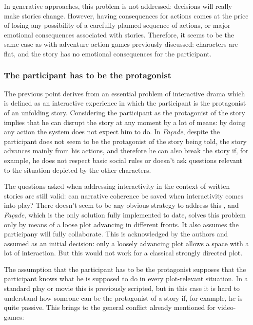 \documentclass[
		twoside,openright,titlepage,numbers=noenddot,manychapters,
		headinclude,%
                footinclude=false,cleardoublepage=empty,
                BCOR=5mm,
		fontsize=11pt, %
                 enabledeprecatedfontcommands]{scrreprt}
\begin{document}
In generative approaches, this problem is not addressed: decisions will really make stories change. However, having consequences for actions comes at the price of losing any possibility of a carefully planned sequence of actions, or major emotional consequences associated with stories. Therefore, it seems to be the same case as with adventure-action games previously discussed: characters are flat, and the story has no emotional consequences for the participant.



\subsubsection{The participant has to be the protagonist} 
The previous point  derives from an  essential problem of interactive drama which is defined as an interactive experience in which the participant is the protagonist of an unfolding story. Considering the participant as the protagonist of the story implies that he can disrupt the story at any moment by a lot of means:  by doing any action the system does not expect him to do. In \emph{Façade}, despite the participant does not seem to be the protagonist of the story being told, the story advances mainly from his actions, and therefore he can also break the story if, for example, he does not respect basic social rules or doesn't ask questions relevant to the situation depicted by the other characters.



The questions asked when addressing interactivity in the context of written stories are still valid: can narrative coherence be saved when interactivity comes into play? There doesn't seem to be any obvious strategy to address this \cite[chapter 8]{ryan2000narrative}, and \emph{Façade}, which is the only solution fully implemented to date, solves this problem only by means of a loose plot advancing in different fronts. It also assumes the participany will fully collaborate. This is acknowledged by the authors and assumed as an initial decision: only a loosely advancing plot allows a space with a lot of interaction. 
But this would not work for a classical strongly directed plot.



The assumption that the participant has to be the protagonist supposes that the participant knows what he is supposed to do in every plot-relevant situation. In a standard play or movie this is previously scripted, but in this case it is hard to understand how someone can be the protagonist of a story if, for example, he is quite passive.%
This brings to the general conflict already mentioned for video-games: %
\end{document}
